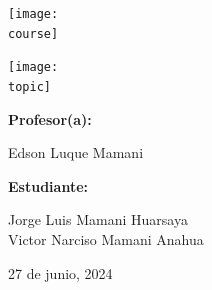 \documentclass[10pt, a4paper]{article}
\newcommand{\course}{img/data_structures.png}
\newcommand{\topic}{img/skipList_and_splayTree.png}
\newcommand{\professor}{Edson Luque Mamani}
\newcommand{\students}{Jorge Luis Mamani Huarsaya\\Victor Narciso Mamani Anahua}
\newcommand{\mydate}{27 de junio, 2024}
\begin{document}
\begin{titlepage}
	\centering
	\texttt{[image: \\course]} \par
  \vfill \vfill
	\texttt{[image: \\topic]}\par
  \vfill \vfill
  {\textbf{Profesor(a):} \par}
	\professor \vfill
  {\textbf{Estudiante:} \par}
	\students \vfill
	{\large \mydate \par}
\end{titlepage}



\end{document}
